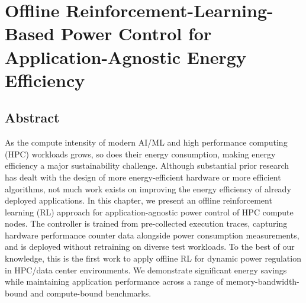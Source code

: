 

\chapter{Offline Reinforcement-Learning-Based Power Control for Application-Agnostic Energy Efficiency} \label{CH5_HPDC}

\graphicspath{{Papers/HPDC/}}

\section*{Abstract}
As the compute intensity of modern AI/ML and high performance computing (HPC) workloads
grows, so does their energy consumption, making energy efficiency a major
sustainability challenge. Although substantial prior research has dealt with the
design of more energy-efficient hardware or more efficient algorithms, not much
work exists on improving the energy efficiency of already deployed applications.
In this chapter, we present an offline reinforcement learning (RL) approach for
application-agnostic power control of HPC compute nodes. The controller is trained
from pre-collected execution traces, capturing hardware performance counter data
alongside power consumption measurements, and is deployed without retraining on
diverse test workloads. To the best of our knowledge, this is the first work to
apply offline RL for dynamic power regulation in HPC/data center environments.
We demonstrate significant energy savings while maintaining application performance
across a range of memory-bandwidth-bound and compute-bound benchmarks.
















